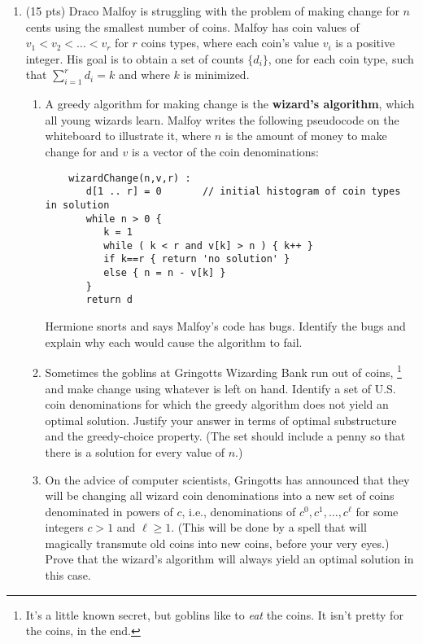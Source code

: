 \documentclass[12pt]{article}
\begin{document}
\begin{enumerate}
\item (15 pts) Draco Malfoy is struggling with the problem of making change for $n$ cents using the smallest number of coins. Malfoy has coin values of $v_{1}<v_{2}<\dots<v_{r}$ for $r$ coins types, where each coin's value $v_{i}$ is a positive integer. His goal is to obtain a set of counts $\{d_{i}\}$, one for each coin type, such that $\sum_{i=1}^{r}d_{i}=k$ and where $k$ is minimized.
	\begin{enumerate}
	\item A greedy algorithm for making change is the \textbf{wizard's algorithm}, which all young wizards learn. Malfoy writes the following pseudocode on the whiteboard to illustrate it, where $n$ is the amount of money to make change for and $v$ is a vector of the coin denominations:
	\begin{small}
	\begin{verbatim}
	wizardChange(n,v,r) :
	   d[1 .. r] = 0       // initial histogram of coin types in solution
	   while n > 0 {
	      k = 1
	      while ( k < r and v[k] > n ) { k++ }
	      if k==r { return 'no solution' }
	      else { n = n - v[k] }
	   }
	   return d
	\end{verbatim}
	\end{small}
	Hermione snorts and says Malfoy's code has bugs. Identify the bugs and explain why each would cause the algorithm to fail.




	\item Sometimes the goblins at Gringotts Wizarding Bank run out of coins,%
	\footnote{It's a little known secret, but goblins like to \textit{eat} the coins. It isn't pretty for the coins, in the end.}
	and make change using whatever is left on hand. Identify a set of U.S. coin denominations for which the greedy algorithm does not yield an optimal solution. Justify your answer in terms of optimal substructure and the greedy-choice property. (The set should include a penny so that there is a solution for every value of $n$.)


	\item On the advice of computer scientists, Gringotts has announced that they will be changing all wizard coin denominations into a new set of coins denominated in powers of $c$, i.e., denominations of $c^{0}, c^{1}, \dots , c^{\ell}$ for some integers $c>1$ and $\ell\geq 1$. (This will be done by a spell that will magically transmute old coins into new coins, before your very eyes.) Prove that the wizard's algorithm will always yield an optimal solution in this case.


\end{enumerate}
\end{enumerate}
\end{document}
